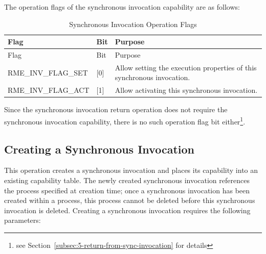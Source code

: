 The operation flags of the synchronous invocation capability are as follows:

\begin{xltabular}{\textwidth}{@{}>{\hsize\raggedright\arraybackslash}X>{\hsize\raggedright\arraybackslash}X>{\hsize\raggedright\arraybackslash}X@{}}
\caption{Synchronous Invocation Operation Flags}\label{tab:5-3-sync-invocation-operation-flags}\\
\toprule
Flag & Bit & Purpose\tabularnewline
\endfirsthead
\toprule
Flag & Bit & Purpose\tabularnewline
\midrule
\endhead
\bottomrule
\endlastfoot
RME\_INV\_FLAG\_SET & {[}0{]} &
Allow setting the execution properties of this synchronous invocation.\tabularnewline
RME\_INV\_FLAG\_ACT & {[}1{]} & Allow activating this synchronous invocation.\tabularnewline
\end{xltabular}
\nopagebreak[4]

Since the synchronous invocation return operation does not require the synchronous invocation capability, there is no such operation flag bit either\footnote{see Section~\ref{subsec:5-return-from-sync-invocation} for details}.

\subsection{Creating a Synchronous Invocation}\label{subsec:5-create-sync-invocation}

This operation creates a synchronous invocation and places its capability into an existing capability table. The newly created synchronous invocation references the process specified at creation time; once a synchronous invocation has been created within a process, this process cannot be deleted before this synchronous invocation is deleted. Creating a synchronous invocation requires the following parameters:

